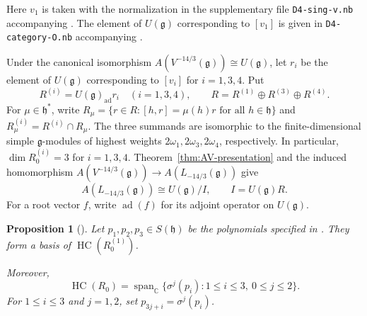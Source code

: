 \documentclass[11pt]{amsart}
\numberwithin{equation}{section}
\newtheorem{proposition}[theorem]{Proposition}
\theoremstyle{definition}
\theoremstyle{remark}
\newcommand{\g}{\mathfrak g}
\newcommand{\h}{\mathfrak h}
\newcommand{\HC}{\operatorname{HC}}
\begin{document}
Here $v_1$ is taken with the normalization in the supplementary file
\texttt{D4-sing-v.nb} accompanying \cite[Theorem~3.1]{AV}. The element
of $U(\g)$ corresponding to $[v_1]$ is given in \texttt{D4-category-O.nb} accompanying
\cite[Section 3]{AV}. %

Under the canonical isomorphism $A(V^{-14/3}(\g))\cong U(\g)$,
let $r_i$ be the element of $U(\g)$ corresponding to $[v_i]$ for $i=1,3,4$. Put
\[
 R^{(i)}=U(\g)_{\mathrm{ad}}r_i\quad(i=1,3,4),
 \qquad R=R^{(1)}\oplus R^{(3)}\oplus R^{(4)}.
\]
For $\mu\in\h^*$, write $R_\mu=\{r\in R:[h,r]=\mu(h)r
\text{ for all }h\in\h\}$ and $R^{(i)}_\mu=R^{(i)}\cap R_\mu$.
The three summands are isomorphic to the finite-dimensional simple
$\g$-modules of highest weights $2\omega_1,2\omega_3,2\omega_4$,
respectively. In particular, $\dim R^{(i)}_0=3$ for $i=1,3,4$.
Theorem~\ref{thm:AV-presentation} and the induced homomorphism
$A(V^{-14/3}(\g))\longrightarrow A(L_{-14/3}(\g))$ give
\begin{equation}\label{eq:A-affine-presentation}
 A(L_{-14/3}(\g))\cong U(\g)/I,
 \qquad I=U(\g)R.
\end{equation}
For a root vector $f$, write $\operatorname{ad}(f)$ for its adjoint
operator on $U(\g)$.

\begin{proposition}[{\cite[Lemma 3.3]{AV}}]\label{prop:AV-polynomials}
Let $p_1,p_2,p_3\in S(\h)$ be the polynomials specified in
\cite[Lemma~3.3]{AV}. They form a basis of $\HC(R^{(1)}_0)$.

Moreover,
\[
 \operatorname{HC}(R_0)=
 \operatorname{span}_{\mathbb C}
 \{\sigma^j(p_i):1\leq i\leq3,\ 0\leq j\leq2\}.
\]
For $1\leq i\leq3$ and $j=1,2$, set $p_{3j+i}=\sigma^j(p_i)$.
\end{proposition}
\end{document}
